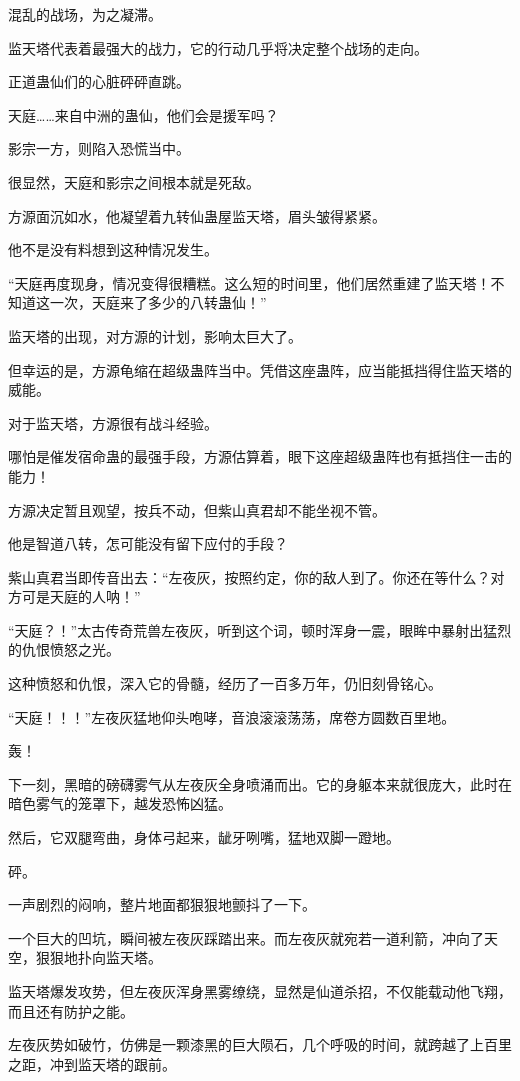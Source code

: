 \begin{this_body}
混乱的战场，为之凝滞。

监天塔代表着最强大的战力，它的行动几乎将决定整个战场的走向。

正道蛊仙们的心脏砰砰直跳。

天庭……来自中洲的蛊仙，他们会是援军吗？

影宗一方，则陷入恐慌当中。

很显然，天庭和影宗之间根本就是死敌。

方源面沉如水，他凝望着九转仙蛊屋监天塔，眉头皱得紧紧。

他不是没有料想到这种情况发生。

“天庭再度现身，情况变得很糟糕。这么短的时间里，他们居然重建了监天塔！不知道这一次，天庭来了多少的八转蛊仙！”

监天塔的出现，对方源的计划，影响太巨大了。

但幸运的是，方源龟缩在超级蛊阵当中。凭借这座蛊阵，应当能抵挡得住监天塔的威能。

对于监天塔，方源很有战斗经验。

哪怕是催发宿命蛊的最强手段，方源估算着，眼下这座超级蛊阵也有抵挡住一击的能力！

方源决定暂且观望，按兵不动，但紫山真君却不能坐视不管。

他是智道八转，怎可能没有留下应付的手段？

紫山真君当即传音出去：“左夜灰，按照约定，你的敌人到了。你还在等什么？对方可是天庭的人呐！”

“天庭？！”太古传奇荒兽左夜灰，听到这个词，顿时浑身一震，眼眸中暴射出猛烈的仇恨愤怒之光。

这种愤怒和仇恨，深入它的骨髓，经历了一百多万年，仍旧刻骨铭心。

“天庭！！！”左夜灰猛地仰头咆哮，音浪滚滚荡荡，席卷方圆数百里地。

轰！

下一刻，黑暗的磅礴雾气从左夜灰全身喷涌而出。它的身躯本来就很庞大，此时在暗色雾气的笼罩下，越发恐怖凶猛。

然后，它双腿弯曲，身体弓起来，龇牙咧嘴，猛地双脚一蹬地。

砰。

一声剧烈的闷响，整片地面都狠狠地颤抖了一下。

一个巨大的凹坑，瞬间被左夜灰踩踏出来。而左夜灰就宛若一道利箭，冲向了天空，狠狠地扑向监天塔。

监天塔爆发攻势，但左夜灰浑身黑雾缭绕，显然是仙道杀招，不仅能载动他飞翔，而且还有防护之能。

左夜灰势如破竹，仿佛是一颗漆黑的巨大陨石，几个呼吸的时间，就跨越了上百里之距，冲到监天塔的跟前。


\end{this_body}
